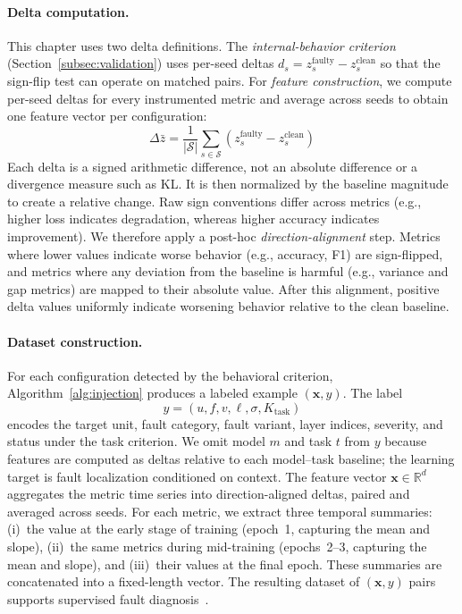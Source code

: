 \paragraph{Delta computation.}
This chapter uses two delta definitions. The \emph{internal-behavior criterion} (Section~\ref{subsec:validation}) uses per-seed deltas $d_s = z_s^{\text{faulty}} - z_s^{\text{clean}}$ so that the sign-flip test can operate on matched pairs. For \emph{feature construction}, we compute per-seed deltas for every instrumented metric and average across seeds to obtain one feature vector per configuration:
\[
\Delta \bar{z} = \frac{1}{|\mathcal{S}|}\sum_{s \in \mathcal{S}} (z_s^{\text{faulty}} - z_s^{\text{clean}})
\]
Each delta is a signed arithmetic difference, not an absolute difference or a divergence measure such as KL. It is then normalized by the baseline magnitude to create a relative change. Raw sign conventions differ across metrics (e.g., higher loss indicates degradation, whereas higher accuracy indicates improvement). We therefore apply a post-hoc \emph{direction-alignment} step. Metrics where lower values indicate worse behavior (e.g., accuracy, F1) are sign-flipped, and metrics where any deviation from the baseline is harmful (e.g., variance and gap metrics) are mapped to their absolute value. After this alignment, positive delta values uniformly indicate worsening behavior relative to the clean baseline.

\paragraph{Dataset construction.}
For each configuration detected by the behavioral criterion, Algorithm~\ref{alg:injection} produces a labeled example $(\mathbf{x}, y)$. The label
\[
y = (u, f, v, \ell, \sigma, K_{\text{task}})
\]
encodes the target unit, fault category, fault variant, layer indices, severity, and status under the task criterion. We omit model $m$ and task $t$ from $y$ because features are computed as deltas relative to each model--task baseline; the learning target is fault localization conditioned on context. The feature vector $\mathbf{x} \in \mathbb{R}^d$ aggregates the metric time series into direction-aligned deltas, paired and averaged across seeds. For each metric, we extract three temporal summaries: (i)~the value at the early stage of training (epoch~1, capturing the mean and slope), (ii)~the same metrics during mid-training (epochs~2--3, capturing the mean and slope), and (iii)~their values at the final epoch. These summaries are concatenated into a fixed-length vector. The resulting dataset of $(\mathbf{x}, y)$ pairs supports supervised fault diagnosis~\citep{deepfd}.


